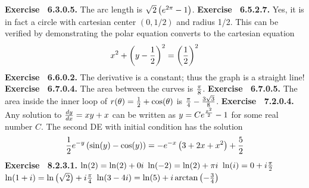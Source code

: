  {\noindent \protect \bf  Exercise ~6.3.0.5.} The arc length is $\protect \sqrt  {2}\left (e^{2\pi }-1\right )$. \protect \newline  \protect \newline  
 {\noindent \protect \bf  Exercise ~6.5.2.7.} Yes, it is in fact a circle with cartesian center $\left (0,1/2\right )$ and radius 1/2. This can be verified by demonstrating the polar equation converts to the cartesian equation $$x^2+\left (y-\protect \frac  {1}{2}\right )^2=\left (\protect \frac  {1}{2}\right )^2 $$ \protect \newline  \protect \newline  
 {\noindent \protect \bf  Exercise ~6.6.0.2.} The derivative is a constant; thus the graph is a straight line! \protect \newline  \protect \newline  
 {\noindent \protect \bf  Exercise ~6.7.0.4.} The area between the curves is $\protect \frac  {\pi }{8}$. \protect \newline  \protect \newline  
 {\noindent \protect \bf  Exercise ~6.7.0.5.} The area inside the inner loop of $r(\theta )=\protect \frac  {1}{2}+\protect \qopname  \relax o{cos}(\theta )$ is $\protect \frac  {\pi }{4}-\protect \frac  {3\protect \sqrt  {3}}{8}$. \protect \newline  \protect \newline  
 {\noindent \protect \bf  Exercise ~7.2.0.4.} Any solution to $\protect \frac  {dy}{dx}=xy+x$ can be written as $y=Ce^{\protect \frac  {x^2}{2}}-1$ for some real number $C$. The second DE with initial condition has the solution $$\protect \frac  {1}{2}e^{-y}\left (\protect \qopname  \relax o{sin}(y)-\protect \qopname  \relax o{cos}(y)\right )=-e^{-x}\left (3+2x+x^2\right )+\protect \frac  {5}{2} $$ \protect \newline  \protect \newline  
 {\noindent \protect \bf  Exercise ~8.2.3.1.} \textbullet $\protect \qopname  \relax o{ln}(2)=\protect \qopname  \relax o{ln}(2)+0i$ \textbullet $\protect \qopname  \relax o{ln}(-2)=\protect \qopname  \relax o{ln}(2)+\pi i$ \textbullet $\protect \qopname  \relax o{ln}(i)=0+i\protect \frac  {\pi }{2}$ \textbullet $\protect \qopname  \relax o{ln}(1+i)=\protect \qopname  \relax o{ln}\left (\protect \sqrt  {2}\right )+i\protect \frac  {\pi }{4}$ \textbullet $\protect \qopname  \relax o{ln}(3-4i)=\protect \qopname  \relax o{ln}(5)+i\protect \qopname  \relax o{arctan}\left (-\protect \frac  {3}{4}\right )$ \protect \newline  \protect \newline  
